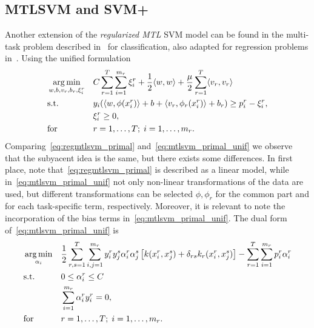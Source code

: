 \subsection{MTLSVM and SVM+}
Another extension of the \emph{regularized MTL} SVM model can be found in 
the multi-task problem described in~\cite{LiangC08} for classification, also adapted for regression problems in~\cite{CaiC09}. Using the unified formulation
\begin{equation}\label{eq:mtlsvm_primal_unif}
    \nonumber
    \begin{aligned}
        & \argmin_{w, b, v_r, b_r, \xi_i^r}
        & & C \sum_{r=1}^\ntasks \sum_{i=1}^{\npertask_r} \xi_i^r + \frac{1}{2} \dotp{w}{w} + \frac{\mu}{2} \sum_{r=1}^\ntasks \dotp{v_r}{v_r} \\
        & \text{s.t.}
        & & y_{i} ( \dotp{w}{\phi(x_{i}^r)} + b + \dotp{v_r}{\phi_r(x_{i}^r)} + b_r) \geq p_i^r - \xi_i^r ,\\
        & & &\xi_i^r \geq 0, \\
        & \text{for } & & r=1, \ldots, \ntasks; \; i=1, \ldots, \npertask_r.
    \end{aligned}
\end{equation}
Comparing~\eqref{eq:regmtlsvm_primal} and~\eqref{eq:mtlsvm_primal_unif} we observe that the subyacent idea is the same, but there exists some differences. In first place, note that~\eqref{eq:regmtlsvm_primal} is described as a linear model, while in~\eqref{eq:mtlsvm_primal_unif} not only non-linear transformations of the data are used, but different transformations can be selected $\phi, \phi_r$ for the common part and for each task-specific term, respectively. Moreover, it is relevant to note the incorporation of the bias terms in~\eqref{eq:mtlsvm_primal_unif}.
The dual form of~\eqref{eq:mtlsvm_primal_unif} is
\begin{equation}\label{eq:mtlsvm_dual_unif}
    \begin{aligned}
        & \argmin_{\alpha_i} 
        & & \frac{1}{2} \sum_{r, s=1}^\ntasks \sum_{i, j=1}^{\npertask_r} y_i^r y_j^s \alpha_i^r \alpha_j^s \left[k(x_i^r, x_j^s) + \delta_{rs} k_r(x^r_i, x^s_j) \right] - \sum_{r=1}^\ntasks \sum_{i=1}^{\npertask_r} p_i^r \alpha_i^r \\
        & \text{s.t.}
        & & 0 \leq \alpha_i^r \leq C \\
        & & & \sum_{i=1}^{\npertask_r}{\alpha_i^r y_i^r} = 0, \\
        & \text{for } & & r=1, \ldots, \ntasks; \; i=1, \ldots, \npertask_r.
        \end{aligned}
\end{equation}
